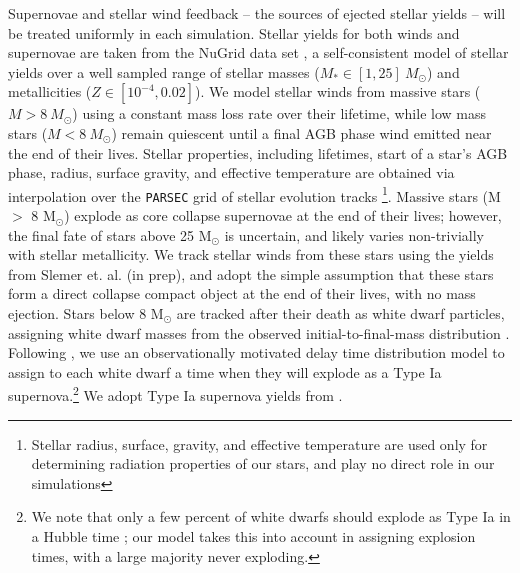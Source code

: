 \documentclass[11pt]{article}
\newcommand{\eg}{e.g.,}
\begin{document}
Supernovae and stellar wind feedback -- the sources of ejected stellar yields -- will be treated uniformly in each simulation. Stellar yields for both winds and supernovae are taken from the NuGrid data set \citep[][Ritter et. al. in prep]{Pignatari2016}, a self-consistent model of stellar yields over a well sampled range of stellar masses ($M_{*} \in [1,25]~M_{\odot}$) and metallicities ($Z\in [10^{-4},0.02]$). We model stellar winds from massive stars ($M > 8~M_{\odot}$) using a constant mass loss rate over their lifetime, while low mass stars ($M < 8~M_{\odot}$) remain quiescent until a final AGB phase wind emitted near the end of their lives. Stellar properties, including lifetimes,  start of a star's AGB phase, radius, surface gravity, and effective temperature are obtained via interpolation over the \texttt{PARSEC} grid of stellar evolution tracks \citep{Bressan2012}\footnote{Stellar radius, surface, gravity, and effective temperature are used only for determining radiation properties of our stars, and play no direct role in our simulations}. Massive stars (M $>$ 8 M$_{\odot}$) explode as core collapse supernovae at the end of their lives; however, the final fate of stars above 25 M$_{\odot}$ is uncertain, and likely varies non-trivially with stellar metallicity. We track stellar winds from these stars using the yields from Slemer et. al. (in prep), and adopt the simple assumption that these stars form a direct collapse compact object at the end of their lives, with no mass ejection. Stars below 8 M$_{\odot}$ are tracked after their death as white dwarf particles, assigning white dwarf masses from the observed initial-to-final-mass distribution \citep{Salaris2009}. Following \citep{Cote2015}, we use an observationally motivated delay time distribution model \citep[\eg][]{Maoz2014} to assign to each white dwarf a time when they will explode as a Type Ia supernova.\footnote{We note that only a few percent of white dwarfs should explode as Type Ia in a Hubble time \citep{Maoz2014}; our model takes this into account in assigning explosion times, with a large majority never exploding.} We adopt Type Ia supernova yields from \cite{Thielemann1986}.
\end{document}
